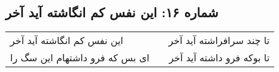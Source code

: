 \begin{center}
\section*{شماره ۱۶: این نفس کم انگاشته آید آخر}
\label{sec:016}
\begin{longtable}{l p{0.5cm} r}
این نفس کم انگاشته آید آخر
&&
تا چند سرافراشته آید آخر
\\
ای بس که فرو داشتهام این سگ را
&&
تا بوکه فرو داشته آید آخر
\\
\end{longtable}
\end{center}

